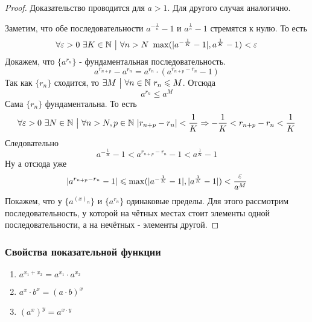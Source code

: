 \begin{proof}
	Доказательство проводится для $a > 1$. Для другого случая аналогично.
	
	Заметим, что обе последовательности $a^{-\frac{1}{n}} - 1$ и $a^{\frac{1}{n}} - 1$ стремятся к нулю. То есть
	$$
		\forall \varepsilon > 0\ \exists K \in \mathbb{N} \ \big|\  \forall n > N\ \max(|a^{-\frac{1}{K}} - 1|, a^{\frac{1}{K}} - 1) < \varepsilon
	$$
	Докажем, что $\{a^{r_n}\}$ - фундаментальная последовательность.
	$$
		a^{r_{n + p}} - a^{r_n} = a^{r_n} \cdot (a^{r_{n + p} - r_n} - 1)
	$$
	Так как $\{r_n\}$ сходится, то $\exists M \ \big|\  \forall n \in \mathbb{N}\ r_n \leqslant M$. Отсюда
	$$
		a^{r_n} \le a^M
	$$
	Сама $\{r_n\}$ фундаментальна. То есть
	$$
		\forall \varepsilon > 0\ \exists N \in \mathbb{N} \ \big|\  \forall n > N, p \in \mathbb{N}\ |r_{n + p} - r_n| < \frac{1}{K} \Rightarrow -\frac{1}{K} < r_{n + p} - r_n < \frac{1}{K}
	$$
	Следовательно
	$$
		a^{-\frac{1}{K}} - 1 < a^{r_{n + p} - r_n} - 1 < a^{\frac{1}{K}} - 1
	$$
	Ну а отсюда уже
	$$
		|a^{r_{n + p} - r_n} - 1| \leqslant \max(|a^{-\frac{1}{K}} - 1|, |a^{\frac{1}{K}} - 1|) < \frac{\varepsilon}{a^M}
	$$
	Покажем, что у $\{a^{(x)_n}\}$ и $\{a^{r_n}\}$ одинаковые пределы. Для этого рассмотрим последовательность, у которой на чётных местах стоит элементы одной последовательности, а на нечётных - элементы другой.
\end{proof}

\subsubsection*{Свойства показательной функции}

\begin{enumerate}
	\item $a^{x_1 + x_2} = a^{x_1} \cdot a^{x_2}$
	\item $a^x \cdot b^x = (a \cdot b)^x$
	\item $(a^x)^y = a^{x \cdot y}$
\end{enumerate}


